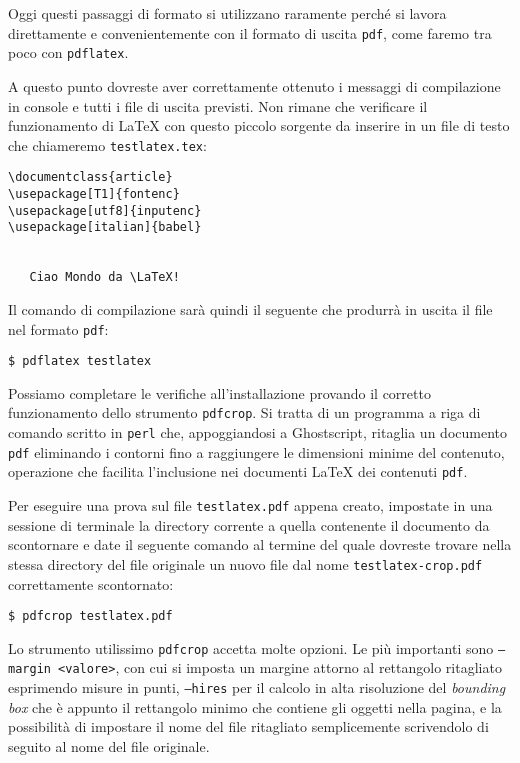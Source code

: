 Oggi questi passaggi di formato si utilizzano raramente perché si lavora
direttamente e convenientemente con il formato di uscita \texttt{pdf}, come
faremo tra poco con \texttt{pdflatex}.

A questo punto dovreste aver correttamente ottenuto i messaggi di compilazione
in console e tutti i file di uscita previsti. Non rimane che verificare il
funzionamento di \LaTeX{} con questo piccolo sorgente da inserire in un file di
testo che chiameremo \texttt{testlatex.tex}:
\begin{Verbatim}[fontsize=\small]
\documentclass{article}
\usepackage[T1]{fontenc}
\usepackage[utf8]{inputenc}
\usepackage[italian]{babel}


   Ciao Mondo da \LaTeX!

\end{Verbatim}

Il comando di compilazione sarà quindi il seguente che produrrà in uscita il
file nel formato \texttt{pdf}:
\begin{verbatim}
$ pdflatex testlatex
\end{verbatim}

Possiamo completare le verifiche all'installazione provando il corretto
funzionamento dello strumento \texttt{pdfcrop}. Si tratta di un programma a riga
di comando scritto in \texttt{perl} che, appoggiandosi a \textsf{Ghostscript},
ritaglia un documento \texttt{pdf} eliminando i contorni fino a raggiungere le
dimensioni minime del contenuto, operazione che facilita l'inclusione nei
documenti \LaTeX{} dei contenuti \texttt{pdf}.

Per eseguire una prova sul file \texttt{testlatex.pdf} appena creato, impostate
in una sessione di terminale la directory corrente a quella contenente il
documento da scontornare e date il seguente comando al termine del quale
dovreste trovare nella stessa directory del file originale un nuovo file dal
nome \texttt{testlatex-crop.pdf} correttamente scontornato:
\begin{verbatim}
$ pdfcrop testlatex.pdf
\end{verbatim}

Lo strumento utilissimo \texttt{pdfcrop} accetta molte opzioni. Le più
importanti sono \texttt{--margin <valore>}, con cui si imposta un margine
attorno al rettangolo ritagliato esprimendo misure in punti, \texttt{--hires}
per il calcolo in alta risoluzione del \emph{bounding box} che è appunto il
rettangolo minimo che contiene gli oggetti nella pagina, e la possibilità di
impostare il nome del file ritagliato semplicemente scrivendolo di seguito al
nome del file originale.

